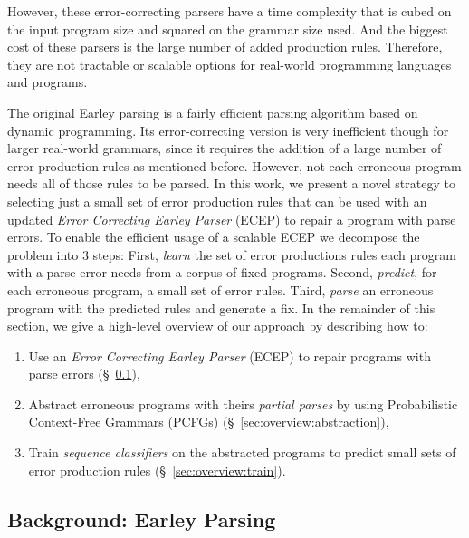  However, these error-correcting parsers have a time
complexity that is cubed on the input program size and squared on the grammar
size used. And the biggest cost of these parsers is the large number of added
production rules. Therefore, they are not tractable or scalable options for
real-world programming languages and programs.


 The original Earley
parsing is a fairly efficient parsing algorithm \citep{?} based on dynamic
programming. Its error-correcting version is very inefficient though for larger
real-world grammars, since it requires the addition of a large number of error
production rules as mentioned before. However, not each erroneous program needs
all of those rules to be parsed. In this work, we present a novel strategy to
selecting just a small set of error production rules that can be used with an
updated \emph{Error Correcting Earley Parser} (ECEP) to repair a program with
parse errors.
%
To enable the efficient usage of a scalable ECEP we decompose the problem into 3
steps:
%
First, \emph{learn} the set of error productions rules each program with a parse
error needs from a corpus of fixed programs.
%
Second, \emph{predict}, for each erroneous program, a small set of error rules.
%
Third, \emph{parse} an erroneous program with the predicted rules and generate a
fix.
%
In the remainder of this section, we give a high-level overview
of our approach by describing how to:

\begin{enumerate}

  \item Use an \emph{Error Correcting Earley Parser} (ECEP) to repair programs
  with parse errors (\S~\ref{sec:overview:earleyparsing}),

  \item Abstract erroneous programs with theirs \emph{partial parses} by using
  Probabilistic Context-Free Grammars (PCFGs)
  (\S~\ref{sec:overview:abstraction}),

  \item Train \emph{sequence classifiers} on the abstracted programs to predict
  small sets of error production rules (\S~\ref{sec:overview:train}).

\end{enumerate}

\subsection{Background: Earley Parsing}
\label{sec:overview:earleyparsing}

